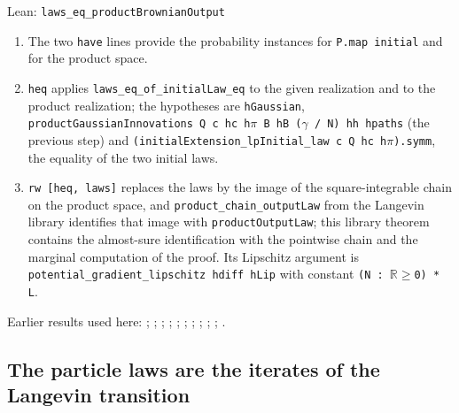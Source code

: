 \documentclass[11pt,a4paper]{report}
\begin{document}
\begin{leanbox}{Lean: \texttt{laws\_\allowbreak{}eq\_\allowbreak{}productBrownianOutput}}
\begin{enumerate}


\item The two \texttt{have} lines provide the probability instances for \texttt{P.\allowbreak{}map initial} and for the product space.

\item \texttt{heq} applies \texttt{laws\_\allowbreak{}eq\_\allowbreak{}of\_\allowbreak{}initial\allowbreak{}Law\_\allowbreak{}eq} to the given realization and to the product realization; the hypotheses are \texttt{h\allowbreak{}Gaussian}, \texttt{product\allowbreak{}Gaussian\allowbreak{}Innovations Q c hc h\ensuremath{\pi} B h\allowbreak{}B (\ensuremath{\gamma} /\allowbreak{} N) hh hpaths} (the previous step) and \texttt{(initial\allowbreak{}Extension\_\allowbreak{}lp\allowbreak{}Initial\_\allowbreak{}law c Q hc h\ensuremath{\pi}).\allowbreak{}symm}, the equality of the two initial laws.

\item \texttt{rw [heq, laws]} replaces the laws by the image of the square-integrable chain on the product space, and \texttt{product\_\allowbreak{}chain\_\allowbreak{}output\allowbreak{}Law} from the Langevin library identifies that image with \texttt{product\allowbreak{}Output\allowbreak{}Law}; this library theorem contains the almost-sure identification with the pointwise chain and the marginal computation of the proof. Its Lipschitz argument is \texttt{potential\_\allowbreak{}gradient\_\allowbreak{}lipschitz hdiff h\allowbreak{}Lip} with constant \texttt{(N : \ensuremath{\mathbb R}\ensuremath{\ge}0) * L}.

\end{enumerate}
\end{leanbox}


Earlier results used here: \cite[Section~3.17.1]{LangevinLean2026ULASC}; \cite[Section~3.17.2]{LangevinLean2026ULASC}; \cite[Section~3.22.19]{LangevinLean2026ULASC}; \cite[Section~3.22.2]{LangevinLean2026ULASC}; \cite[Section~3.22.21]{LangevinLean2026ULASC}; \cite[Section~3.22.3]{LangevinLean2026ULASC}; \cite[Section~3.23.5]{LangevinLean2026ULASC}; \cite[Section~3.23.7]{LangevinLean2026ULASC}; \cite[Section~3.23.9]{LangevinLean2026ULASC}; \cite[Section~3.32.4]{LangevinLean2026ULASC}; \cite[Section~3.32.5]{LangevinLean2026ULASC}.
\subsection{\texorpdfstring{The particle laws are the iterates of the Langevin transition}{The particle laws are the iterates of the Langevin transition}}
\label{report-step-IPLA-ULAAdapter-lean-3}
\end{document}
